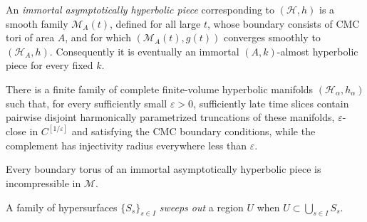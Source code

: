 \begin{definition}
\label{def:chow-iv-immortal-asymptotically-hyperbolic-piece}


An \emph{immortal asymptotically hyperbolic piece} corresponding to
\((\mathcal H,h)\) is a smooth family \(\mathcal M_A(t)\), defined for all
large \(t\), whose boundary consists of CMC tori of area \(A\), and for which
\((\mathcal M_A(t),g(t))\) converges smoothly to \((\mathcal H_A,h)\).
Consequently it is eventually an immortal \((A,k)\)-almost hyperbolic piece
for every fixed \(k\).
\end{definition}

\begin{proposition}
\label{prop:chow-iv-hyperbolic-collapsed-decomposition}


There is a finite family of complete finite-volume hyperbolic manifolds
\((\mathcal H_\alpha,h_\alpha)\) such that, for every sufficiently small
\(\varepsilon>0\), sufficiently late time slices contain pairwise disjoint
harmonically parametrized truncations of these manifolds, \(\varepsilon\)-close
in \(C^{[1/\varepsilon]}\) and satisfying the CMC boundary conditions, while
the complement has injectivity radius everywhere less than \(\varepsilon\).
\end{proposition}

\begin{proposition}
\label{prop:chow-iv-hyperbolic-boundary-incompressible-summary}


Every boundary torus of an immortal asymptotically hyperbolic piece is
incompressible in \(\mathcal M\).
\end{proposition}

\begin{definition}
\label{def:chow-iv-hypersurface-sweep-out}

A family of hypersurfaces \(\{S_s\}_{s\in I}\) \emph{sweeps out} a region
\(U\) when \(U\subset\bigcup_{s\in I}S_s\).
\end{definition}

